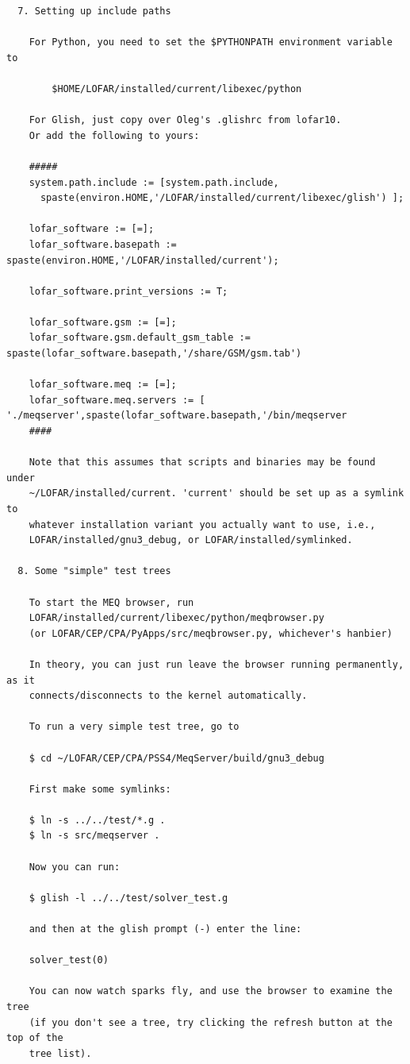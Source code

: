 \documentclass[10pt]{article}
\begin{document}
\begin{verbatim}
  7. Setting up include paths

    For Python, you need to set the $PYTHONPATH environment variable to

        $HOME/LOFAR/installed/current/libexec/python

    For Glish, just copy over Oleg's .glishrc from lofar10. 
    Or add the following to yours:

    #####
    system.path.include := [system.path.include,
      spaste(environ.HOME,'/LOFAR/installed/current/libexec/glish') ];

    lofar_software := [=];
    lofar_software.basepath := spaste(environ.HOME,'/LOFAR/installed/current');

    lofar_software.print_versions := T;

    lofar_software.gsm := [=];
    lofar_software.gsm.default_gsm_table := spaste(lofar_software.basepath,'/share/GSM/gsm.tab')

    lofar_software.meq := [=];
    lofar_software.meq.servers := [ './meqserver',spaste(lofar_software.basepath,'/bin/meqserver
    ####

    Note that this assumes that scripts and binaries may be found under
    ~/LOFAR/installed/current. 'current' should be set up as a symlink to
    whatever installation variant you actually want to use, i.e.,
    LOFAR/installed/gnu3_debug, or LOFAR/installed/symlinked.

  8. Some "simple" test trees

    To start the MEQ browser, run 
    LOFAR/installed/current/libexec/python/meqbrowser.py
    (or LOFAR/CEP/CPA/PyApps/src/meqbrowser.py, whichever's hanbier)

    In theory, you can just run leave the browser running permanently, as it
    connects/disconnects to the kernel automatically.

    To run a very simple test tree, go to 

    $ cd ~/LOFAR/CEP/CPA/PSS4/MeqServer/build/gnu3_debug

    First make some symlinks:

    $ ln -s ../../test/*.g .
    $ ln -s src/meqserver .

    Now you can run:

    $ glish -l ../../test/solver_test.g

    and then at the glish prompt (-) enter the line:

    solver_test(0)

    You can now watch sparks fly, and use the browser to examine the tree
    (if you don't see a tree, try clicking the refresh button at the top of the
    tree list).


\end{verbatim}
\end{document}
